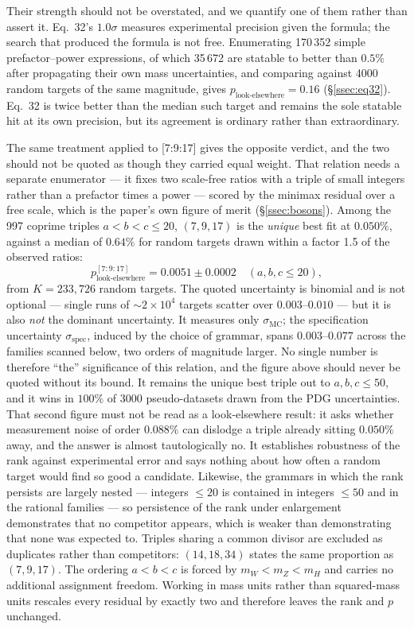 \documentclass[twocolumn,prd,amsmath,amssymb,floatfix]{revtex4-2}
\begin{document}
Their strength should not be overstated, and we quantify one of them rather
than assert it.  Eq.~32's $1.0\sigma$ measures experimental precision given the
formula; the search that produced the formula is not free.  Enumerating 170\,352
simple prefactor--power expressions, of which 35\,672 are statable to better than
$0.5\%$ after propagating their own mass uncertainties, and comparing against
4000 random targets of the same magnitude, gives
$p_\mathrm{look\text{-}elsewhere} = 0.16$ (\S\ref{ssec:eq32}).
Eq.~32 is twice better than the median such target and remains the sole statable
hit at its own precision, but its agreement is ordinary rather than
extraordinary.

The same treatment applied to [7:9:17] gives the opposite verdict, and the two
should not be quoted as though they carried equal weight.  That relation needs a
separate enumerator --- it fixes two scale-free ratios with a triple of small
integers rather than a prefactor times a power --- scored by the minimax residual
over a free scale, which is the paper's own figure of merit
(\S\ref{ssec:bosons}).  Among the 997 coprime triples $a<b<c\le 20$,
$(7,9,17)$ is the \emph{unique} best fit at $0.050\%$, against a median of
$0.64\%$ for random targets drawn within a factor 1.5 of the observed ratios:
\begin{equation}
  p_\mathrm{look\text{-}elsewhere}^{[7:9:17]} = 0.0051 \pm 0.0002
  \quad (a,b,c \le 20) ,
\end{equation}
from $K=233{,}726$ random targets.  The quoted uncertainty is binomial and is
not optional --- single runs of $\sim\!2\times10^{4}$ targets scatter over
$0.003$--$0.010$ --- but it is also \emph{not} the dominant uncertainty.  It
measures only $\sigma_\mathrm{MC}$; the specification uncertainty
$\sigma_\mathrm{spec}$, induced by the choice of grammar, spans
$0.003$--$0.077$ across the families scanned below, two orders of magnitude
larger.  No single number is therefore ``the'' significance of this relation,
and the figure above should never be quoted without its bound.
It remains the unique best triple out to $a,b,c \le 50$, and it wins in
$100\%$ of $3000$ pseudo-datasets drawn from the PDG uncertainties.  That second
figure must not be read as a look-elsewhere result: it asks whether measurement
noise of order $0.088\%$ can dislodge a triple already sitting $0.050\%$ away,
and the answer is almost tautologically no.  It establishes robustness of the
rank against experimental error and says nothing about how often a random target
would find so good a candidate.  Likewise, the grammars in which the rank
persists are largely nested --- integers $\le 20$ is contained in integers
$\le 50$ and in the rational families --- so persistence of the rank under
enlargement demonstrates that no competitor appears, which is weaker than
demonstrating that none was expected to.  Triples sharing a common divisor are
excluded as duplicates rather than competitors: $(14,18,34)$ states the same
proportion as $(7,9,17)$.  The ordering $a<b<c$ is forced by
$m_W<m_Z<m_H$ and carries no additional assignment freedom.  Working in mass
units rather than squared-mass units rescales every residual by exactly two and
therefore leaves the rank and $p$ unchanged.
\end{document}
